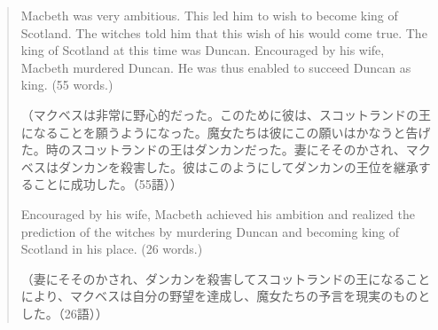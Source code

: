 \begin{quote}
    Macbeth was very ambitious. This led him to wish to become king of
Scotland. The witches told him that this wish of his would come true.
The king of Scotland at this time was Duncan. Encouraged by his wife,
Macbeth murdered Duncan. He was thus enabled to succeed Duncan as king.
(55 words.)

（マクベスは非常に野心的だった。このために彼は、スコットランドの王になることを願うようになった。魔女たちは彼にこの願いはかなうと告げた。時のスコットランドの王はダンカンだった。妻にそそのかされ、マクベスはダンカンを殺害した。彼はこのようにしてダンカンの王位を継承することに成功した。（55語））

Encouraged by his wife, Macbeth achieved his ambition and realized
the prediction of the witches by murdering Duncan and becoming king of
Scotland in his place. (26 words.)

（妻にそそのかされ、ダンカンを殺害してスコットランドの王になることにより、マクベスは自分の野望を達成し、魔女たちの予言を現実のものとした。（26語））
\end{quote}
